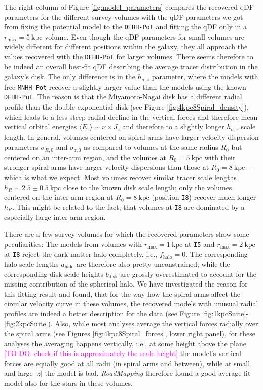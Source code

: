 \documentclass[iop,revtex4,numberedappendix,appendixfloats]{emulateapj}
\newcommand{\RM}{{\sl RoadMapping}}
\newcommand{\Wilma}[1]{\textcolor{Magenta}{#1}}
\begin{document}
The right column of Figure \ref{fig:model_parameters} compares the recovered qDF parameters for the different survey volumes with the qDF parameters we got from fixing the potential model to the \texttt{DEHH-Pot} and fitting the qDF only in a $r_\text{max}=5~\text{kpc}$ volume. Even though the qDF parameters for small volumes are widely different for different positions within the galaxy, they all approach the values recovered with the \texttt{DEHH-Pot} for larger volumes. There seems therefore to be indeed an overall best-fit qDF describing the average tracer distribution in the galaxy's disk. The only difference is in the $h_{\sigma,z}$ parameter, where the models with free \texttt{MNHH-Pot} recover a slightly larger value than the models using the known \texttt{DEHH-Pot}. The reason is that the Miyamoto-Nagai disk has a different radial profile than the double exponential-disk (see Figure \ref{fig:4kpc8Spiral_density}), which leads to a less steep radial decline in the vertical forces and therefore mean vertical orbital energies $\langle E_z \rangle \sim \nu \times J_z$ and therefore to a slightly longer $h_{\sigma,z}$ scale length. In general, volumes centered on spiral arms have larger velocity dispersion parameters $\sigma_{R,0}$ and $\sigma_{z,0}$ as compared to volumes at the same radius $R_0$ but centered on an inter-arm region, and the volumes at $R_0=5~\text{kpc}$ with their stronger spiral arms have larger velocity dispersions than those at $R_0=8~\text{kpc}$---which is what we expect. Most volumes recover similar tracer scale lengths $h_R\sim2.5\pm0.5~\text{kpc}$ close to the known disk scale length; only the volumes centered on the inter-arm region at $R_0=8~\text{kpc}$ (position \texttt{I8}) recover much longer $h_R$. This might be related to the fact, that volumes at \texttt{I8} are dominated by a especially large inter-arm region.

There are a few survey volumes for which the recovered parameters show some peculiarities: The models from volumes with $r_\text{max}=1~\text{kpc}$ at \texttt{I5} and $r_\text{max}=2~\text{kpc}$ at \texttt{I8} reject the dark matter halo completely, i.e., $f_\text{halo}=0$. The corresponding halo scale lengths $a_\text{halo}$ are therefore also pretty unconstrained, while the corresponding disk scale heights $b_\text{disk}$ are grossly overestimated to account for the missing contribution of the spherical halo. We have investigated the reason for this fitting result and found, that for the way how the spiral arms affect the circular velocity curve in these volumes, the recovered models with unusual radial profiles are indeed a better description for the data (see Figure \ref{fig:1kpcSuite}-\ref{fig:2kpcSuite}). Also, while most analyses average the vertical forces radially over the spiral arms (see Figures \ref{fig:4kpc8Spiral_forces}, lower right panel), for these analyses the averaging happens vertically, i.e., at some height above the plane \Wilma{[TO DO: check if this is approximately the scale height]} the model's vertical forces are equally good at all radii (in spiral arms and between), while at small and large $|z|$ the model is bad. \RM{} therefore found a good average fit model also for the stars in these volumes. 
\end{document}
